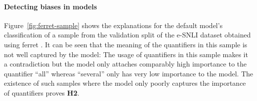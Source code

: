 \paragraph{Detecting biases in models}
Figure~\ref{fig:ferret-sample} shows the explanations for the default model's classification of a sample from the validation split of the \ac{e-SNLI} dataset obtained using ferret \cite{ferret}. It can be seen that the meaning of the quantifiers in this sample is not well captured by the model: The usage of quantifiers in this sample makes it a contradiction but the model only attaches comparably high importance to the quantifier \enquote{all} whereas \enquote{several} only has very low importance to the model. The existence of such samples where the model only poorly captures the importance of quantifiers proves \textbf{H2}.
